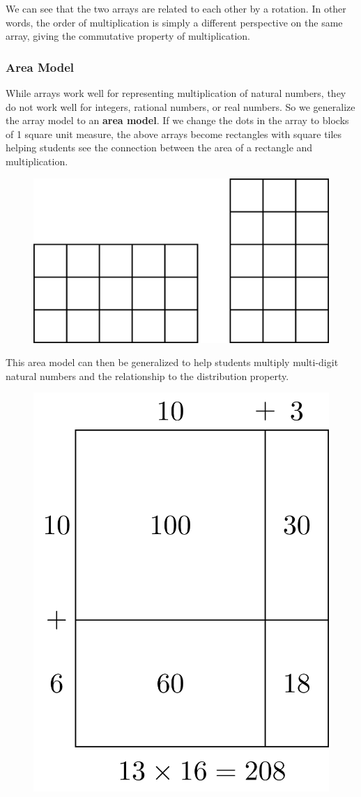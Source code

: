 \documentclass[
]{book}
\theoremstyle{definition}
\theoremstyle{definition}
\theoremstyle{definition}
\theoremstyle{definition}
\theoremstyle{remark}
\begin{document}
We can see that the two arrays are related to each other by a rotation. In other words, the order of multiplication is simply a different perspective on the same array, giving the commutative property of multiplication.

\hypertarget{area-model}{%
\subsubsection*{Area Model}\label{area-model}}

While arrays work well for representing multiplication of natural numbers, they do not work well for integers, rational numbers, or real numbers. So we generalize the array model to an \textbf{area model}. If we change the dots in the array to blocks of 1 square unit measure, the above arrays become rectangles with square tiles helping students see the connection between the area of a rectangle and multiplication.

\begin{figure}

{\centering \includegraphics[width=0.5\linewidth]{tikz/area-model-3by5} 

}

\end{figure}

This area model can then be generalized to help students multiply multi-digit natural numbers and the relationship to the distribution property.

\begin{figure}

{\centering \includegraphics[width=0.4\linewidth]{tikz/area-model-13-16} 

}

\end{figure}
\end{document}
